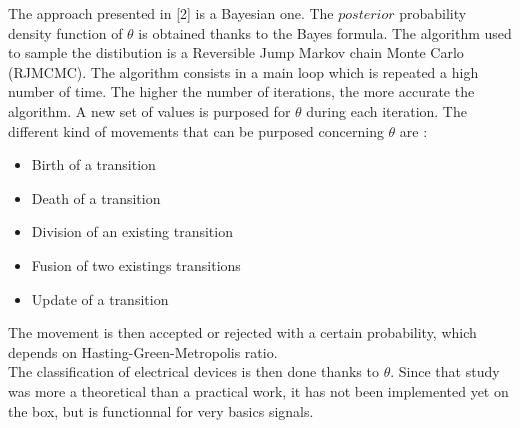 The approach presented in [2] is a Bayesian one. The $posterior$ probability density function of $\theta$ is obtained thanks to the Bayes formula. The algorithm used to sample the distibution is a Reversible Jump Markov chain Monte Carlo (RJMCMC). The algorithm consists in a main loop which is repeated a high number of time. The higher the number of iterations, the more accurate the algorithm. A new set of values is purposed for $\theta$ during each iteration. The different kind of movements that can be purposed concerning $\theta$ are :
\begin{itemize}
\item Birth of a transition
\item Death of a transition
\item Division of an existing transition
\item Fusion of two existings transitions
\item Update of a transition
\end{itemize}
The movement is then accepted or rejected with a certain probability, which depends on Hasting-Green-Metropolis ratio. 
\\

The classification of electrical devices is then done thanks to $\theta$. Since that study was more a theoretical than a practical work, it has not been implemented yet on the box, but is functionnal for very basics signals.

